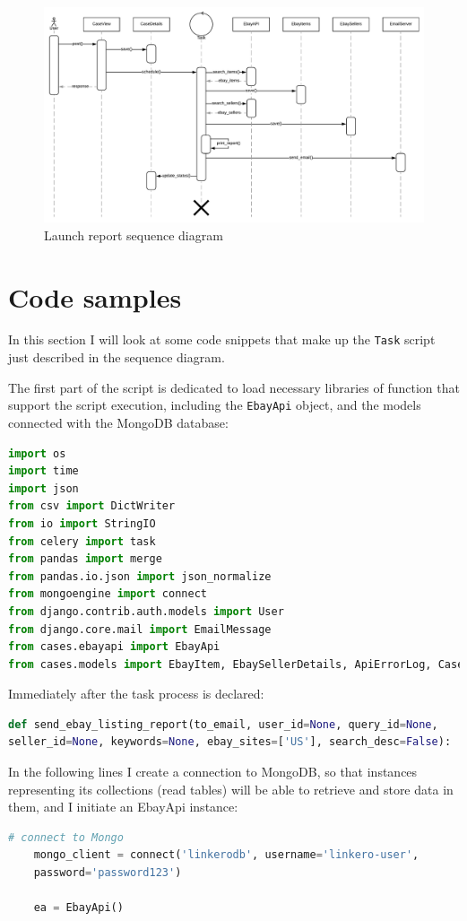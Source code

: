 \begin{figure}[H]
\centering
\includegraphics[angle=90, scale=0.6]{imgs/SequenceDiagram.pdf}
\caption{Launch report sequence diagram}
\label{fig:sqncdiag}
\end{figure}

\section{Code samples}
In this section I will look at some code snippets that make up the
\texttt{Task} script just described in the sequence diagram.

The first part of the script is dedicated to load necessary libraries of
function that support the script execution, including the \texttt{EbayApi}
object, and the models connected with the MongoDB database:
\begin{lstlisting}[language=Python, breaklines=true]
import os
import time
import json
from csv import DictWriter
from io import StringIO
from celery import task
from pandas import merge
from pandas.io.json import json_normalize
from mongoengine import connect
from django.contrib.auth.models import User
from django.core.mail import EmailMessage
from cases.ebayapi import EbayApi
from cases.models import EbayItem, EbaySellerDetails, ApiErrorLog, CaseDetails
\end{lstlisting}

Immediately after the task process is declared:
\begin{lstlisting}[language=Python, breaklines=true]
def send_ebay_listing_report(to_email, user_id=None, query_id=None,
seller_id=None, keywords=None, ebay_sites=['US'], search_desc=False):
\end{lstlisting}

In the following lines I create a connection to MongoDB, so that instances
representing its collections (read tables) will be able to retrieve and store
data in them, and I initiate an EbayApi instance:
\begin{lstlisting}[language=Python, breaklines=true]
    # connect to Mongo
    mongo_client = connect('linkerodb', username='linkero-user',
    password='password123')
        
    ea = EbayApi()
\end{lstlisting}

